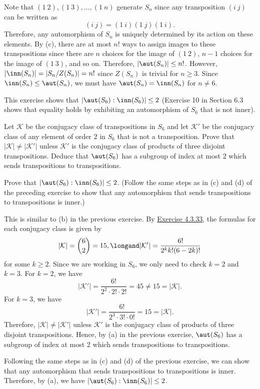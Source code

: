 \begin{solalph}
	\item Note that $(1\ 2), (1\ 3), \ldots, (1\ n)$ generate $S_n$ since any transposition $(i\ j)$ can be written as
	\[(i\ j) = (1\ i)(1\ j)(1\ i).\]
	Therefore, any automorphism of $S_n$ is uniquely determined by its action on these elements. By (c), there are at most $n!$ ways to assign images to these transpositions since there are $n$ choices for the image of $(1\ 2)$, $n - 1$ choices for the image of $(1\ 3)$, and so on. Therefore, $|\aut(S_n)| \leq n!$. However, $|\inn(S_n)| = |S_n/Z(S_n)| = n!$ since $Z(S_n)$ is trivial for $n \geq 3$. Since $\inn(S_n) \leq \aut(S_n)$, we must have $\aut(S_n) = \inn(S_n)$ for $n \neq 6$.
\end{solalph}

\begin{specialexercise}
	This exercise shows that $|\aut(S_6):\inn(S_6)|\le 2$ (Exercise 10 in Section 6.3 shows that equality holds by exhibiting an automorphism of $S_6$ that is not inner).
	\begin{subproblems}
		\item Let $\mathcal K$ be the conjugacy class of transpositions in $S_6$ and let $\mathcal K'$ be the conjugacy class of any element of order $2$ in $S_6$ that is not a transposition. Prove that $|\mathcal K|\neq|\mathcal K'|$ unless $\mathcal K'$ is the conjugacy class of products of three disjoint transpositions. Deduce that $\aut(S_6)$ has a subgroup of index at most $2$ which sends transpositions to transpositions.
		\item Prove that $|\aut(S_6):\inn(S_6)|\le 2$. (Follow the same steps as in (c) and (d) of the preceding exercise to show that any automorphism that sends transpositions to transpositions is inner.)
	\end{subproblems}
\end{specialexercise}

\begin{solalph}
	\item This is similar to (b) in the previous exercise. By \hyperref[ex4.3.33]{Exercise 4.3.33}, the formulas for each conjugacy class is given by
	\[|\mathcal K| = \binom 62 = 15, \longand |\mathcal K'| = \frac{6!}{2^k k! (6 - 2k)!}\]
	for some $k \geq 2$. Since we are working in $S_6$, we only need to check $k = 2$ and $k = 3$. For $k = 2$, we have
	\[|\mathcal K'| = \frac{6!}{2^2 \cdot 2! \cdot 2!} = 45 \neq 15 = |\mathcal K|.\]
	For $k = 3$, we have
	\[|\mathcal K'| = \frac{6!}{2^3 \cdot 3! \cdot 0!} = 15 = |\mathcal K|.\]
	Therefore, $|\mathcal K| \neq |\mathcal K'|$ unless $\mathcal K'$ is the conjugacy class of products of three disjoint transpositions. Hence, by (a) in the previous exercise, $\aut(S_6)$ has a subgroup of index at most 2 which sends transpositions to transpositions.
	\item Following the same steps as in (c) and (d) of the previous exercise, we can show that any automorphism that sends transpositions to transpositions is inner. Therefore, by (a), we have $|\aut(S_6) : \inn(S_6)| \leq 2$.
\end{solalph}

